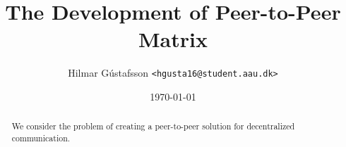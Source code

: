 \documentclass[11pt,twocolumn]{article}
\title{The Development of Peer-to-Peer Matrix}
\author{Hilmar Gústafsson \texttt{<hgusta16@student.aau.dk>}}
\date{\small\today} %
\begin{document}

\maketitle
\begin{abstract}
    We consider the problem of creating a peer-to-peer solution for decentralized communication.
\end{abstract}





\onecolumn


\end{document}

